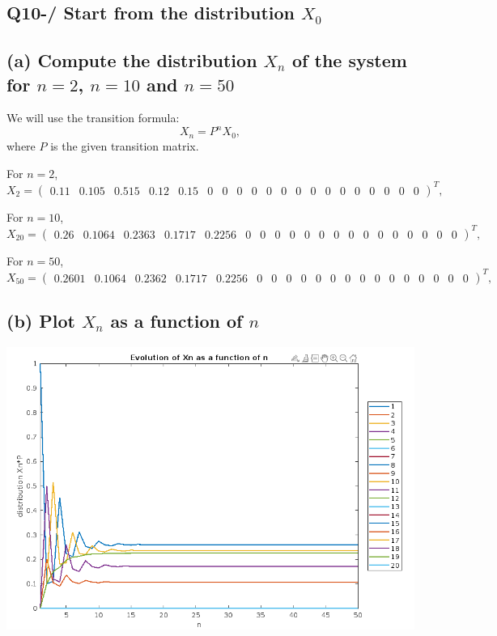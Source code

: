 \documentclass{article}
\begin{document}
    \subsection*{Q10-/ Start from the distribution \( X_0 \)}
    \subsection*{(a) Compute the distribution \( X_n \) of the system for \( n = 2\), \(n = 10\) and \(n = 50 \)}
    We will use the transition formula:
    \[
        X_n = P^n X_0,
    \]
    where \( P \) is the given transition matrix.
    \item For \(n = 2\),
    \[
        X_2 = \begin{pmatrix}
                  0.11 & 0.105 & 0.515 & 0.12 & 0.15 & 0 & 0 & 0 & 0 & 0 & 0 & 0 & 0 & 0 & 0 & 0 & 0 & 0 & 0 & 0
        \end{pmatrix}^T,
    \]
    \item For \(n = 10\),
    \[
        X_{20} = \begin{pmatrix}
                     0.26 & 0.1064 & 0.2363 & 0.1717 & 0.2256 & 0 & 0 & 0 & 0 & 0 & 0 & 0 & 0 & 0 & 0 & 0 & 0 & 0 & 0 & 0
        \end{pmatrix}^T,
    \]
    \item For \(n = 50\),
    \[
        X_{50} = \begin{pmatrix}
                     0.2601 & 0.1064 & 0.2362 & 0.1717 & 0.2256 & 0 & 0 & 0 & 0 & 0 & 0 & 0 & 0 & 0 & 0 & 0 & 0 & 0 & 0 & 0
        \end{pmatrix}^T,
    \]


    \subsection*{(b) Plot \( X_n \) as a function of \( n \)}

    \includegraphics[width=\textwidth]{graph_Xn.png}
\end{document}
